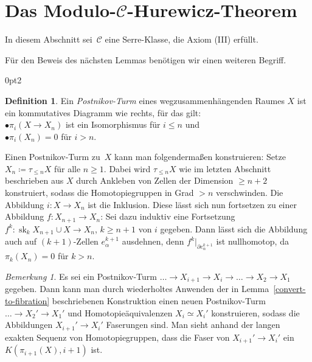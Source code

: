 \documentclass[11pt, a4paper, german]{article}
\theoremstyle{definition}
\newtheorem{defn}[lem]{Definition}
\theoremstyle{remark}
\newtheorem*{bem}{Bemerkung}
\newcommand{\SC}{\mathcal{C}} %
\newcommand{\trunc}[2]{\tau_{#1} #2} %
\DeclareMathOperator{\sk}{sk} %
\newenvironment{centertikzcd}
  {\begin{center}\begin{tikzcd}}
  {\end{tikzcd}\end{center}}
\begin{document}
\section{Das Modulo-$\SC$-Hurewicz-Theorem}

In diesem Abschnitt sei~$\SC$ eine Serre-Klasse, die Axiom (III) erfüllt.


Für den Beweis des nächsten Lemmas benötigen wir einen weiteren Begriff.

\renewcommand\windowpagestuff{
  \vspace{1cm}
  \begin{centertikzcd}[ampersand replacement=\&, column sep=0.2cm, row sep=0.5cm]
    \&\&\& X \arrow[dll] \arrow[dl] \arrow[d] \\
    \dots \arrow[r] \&
    X_3 \arrow[r] \&
    X_2 \arrow[r] \&
    X_1
  \end{centertikzcd}
}
\opencutright
\begin{cutout}{0}{\dimexpr\linewidth-4.5cm\relax}{0pt}{2}
  \begin{defn}
    Ein \emph{Postnikov-Turm} eines wegzusammenhängenden Raumes $X$ ist ein kommutatives Diagramm wie rechts, für das gilt: \\[4pt]
    \quad$\bullet$\enspace $\pi_i(X \to X_n)$ ist ein Isomorphismus für $i \leq n$ und \\
    \quad$\bullet$\enspace $\pi_i(X_n) = 0$ für $i > n$.
  \end{defn}
\end{cutout}

Einen Postnikov-Turm zu~$X$ kann man folgendermaßen konstruieren:
Setze $X_n \coloneqq \trunc{\leq n}{X}$ für alle $n \geq 1$.
Dabei wird $\trunc{\leq n}{X}$ wie im letzten Abschnitt beschrieben aus $X$ durch Ankleben von Zellen der Dimension $\geq n+2$ konstruiert, sodass die Homotopiegruppen in Grad $> n$ verschwinden.
Die Abbildung $i : X \to X_n$ ist die Inklusion.
Diese lässt sich nun fortsetzen zu einer Abbildung $f : X_{n+1} \to X_n$:
Sei dazu induktiv eine Fortsetzung $f^k : \sk_k X_{n+1} \cup X \to X_n$, $k \geq n+1$ von $i$ gegeben.
Dann lässt sich die Abbildung auch auf $(k{+}1)$-Zellen $e^{k+1}_\alpha$ ausdehnen, denn $f^k|_{\partial e^{k+1}_\alpha}$ ist nullhomotop, da $\pi_k(X_n) = 0$ für $k > n$.

\begin{bem}
  Es sei ein Postnikov-Turm $\ldots \to X_{i+1} \to X_i \to \ldots \to X_2 \to X_1$ gegeben.
  Dann kann man durch wiederholtes Anwenden der in Lemma~\ref{convert-to-fibration} beschriebenen Konstruktion einen neuen Postnikov-Turm $\ldots \to X_2' \to X_1'$ und Homotopieäquivalenzen $X_i \simeq X_i'$ konstruieren, sodass die Abbildungen $X_{i+1}' \to X_i'$ Faserungen sind.
  Man sieht anhand der langen exakten Sequenz von Homotopiegruppen, dass die Faser von $X_{i+1}' \to X_i'$ ein $K(\pi_{i+1}(X), i{+}1)$ ist.
\end{bem}
\end{document}
